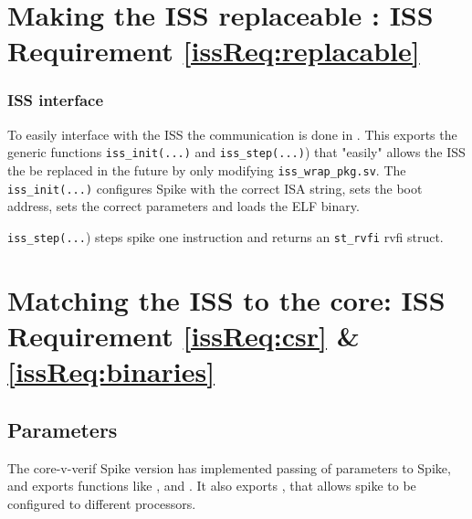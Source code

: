 


\section{Making the ISS replaceable : ISS Requirement \ref{issReq:replacable} }

\subsubsection{ISS interface}

To easily interface with the ISS the communication is done in . This exports the generic functions \lstinline{iss_init(...)} and \lstinline{iss_step(...)}) that "easily" allows the ISS the be replaced in the future by only modifying \lstinline{iss_wrap_pkg.sv}. The \lstinline{iss_init(...)} configures Spike with the correct ISA string, sets the boot address, sets the correct parameters and loads the ELF binary. 

\lstinline{iss_step(...}) steps spike one instruction and returns an \lstinline{st_rvfi} rvfi struct.


\section{Matching the ISS to the core: ISS Requirement \ref{issReq:csr} \& \ref{issReq:binaries}}

\subsection{Parameters}

The core-v-verif Spike version has implemented passing of parameters to Spike, and exports functions like , and \cite{openhwgroupOpenhwgroupCorevverif2023}. It also exports , that allows spike to be configured to different processors. 

